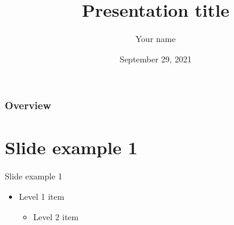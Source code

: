 \documentclass{beamer}
\title[Presentation title]{Presentation title} %
\author{Your name}
\institute[Institution for other slides]
{
    Institution for title slide \\
    \medskip
}
\date{September 29, 2021}
\begin{document}
\begin{frame}
    \titlepage %
\end{frame}

\begin{frame}
    \frametitle{Overview} %
    \tableofcontents %
\end{frame}







\section{Slide example 1}
\begin{frame}{Slide example 1}
    \begin{itemize}
        \item Level 1 item
        \begin{itemize}
            \item Level 2 item
        \end{itemize}
    \end{itemize}
\end{frame}
\end{document}
